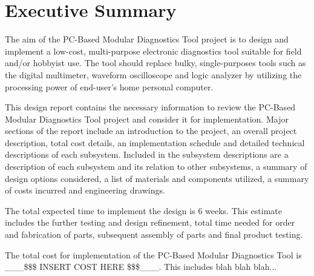 \section*{Executive Summary}
The aim of the PC-Based Modular Diagnostics Tool project is to design and implement
a low-cost, multi-purpose electronic diagnostics tool suitable for field and/or
hobbyist use. The tool should replace bulky, single-purposes tools such as the digital 
multimeter, waveform oscilloscope and logic analyzer by utilizing the processing
power of end-user's home personal computer.

This design report contains the necessary information to review the PC-Based Modular 
Diagnostics Tool project and consider it for implementation. Major sections of the
report include an introduction to the project, an overall project description,
total cost details, an implementation schedule and detailed technical descriptions of each
subsystem. Included in the subsystem descriptions are a description of each subsystem
and its relation to other subsystems, a summary of design options considered, a list 
of materials and components utilized, a summary of costs incurred and engineering drawings.

The total expected time to implement the design is 6 weeks. This estimate includes the 
further testing and design refinement, total time needed for order and fabrication of parts, 
subsequent assembly of parts and final product testing.

The total cost for implementation of the PC-Based Modular Diagnostics Tool is 
\_\_\_\$\$\$ INSERT COST HERE \$\$\$\_\_\_. This includes blah blah blah...


